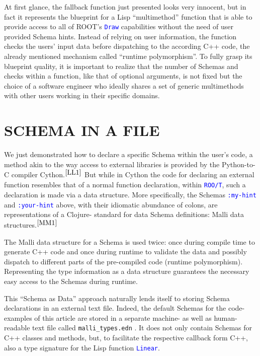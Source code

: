 \documentclass[twocolumn]{article}
\begin{document}
At first glance, the fallback function just presented looks very innocent, but in fact it represents the blueprint for a Lisp “multimethod” function that is able to provide access to all of ROOT’s \texttt{\textcolor{blue}{Draw}} capabilities without the need of user provided Schema hints. Instead of relying on user information, the function checks the users’ input data before dispatching to the according C++ code, the already mentioned mechanism called “runtime polymorphism”. To fully grasp its blueprint quality, it is important to realize that the number of Schemas and checks within a function, like that of optional arguments, is not fixed but the choice of a software engineer who ideally shares a set of generic multimethods with other users working in their specific domains.

\section{SCHEMA IN A FILE}
We just demonstrated how to declare a specific Schema within the user’s code, a method akin to the way access to external libraries is provided by the Python-to-C compiler Cython.$^{\cite{LL1}}$ But while in Cython the code for declaring an external function resembles that of a normal function declaration, within \texttt{\textcolor{blue}{ROO/T}}, such a declaration is made via a data structure. More specifically, the Schemas \texttt{\textcolor{blue}{:my-hint}} and \texttt{\textcolor{blue}{:your-hint}} above, with their idiomatic abundance of colons, are representations of a Clojure- standard for data Schema definitions: Malli data structures.$^{\cite{MM1}}$

The Malli data structure for a Schema is used twice: once during compile time to generate C++ code and once during runtime to validate the data and possibly dispatch to different parts of the pre-compiled code (runtime polymorphism). Representing the type information as a data structure guarantees the necessary easy access to the Schemas during runtime.

This “Schema as Data” approach naturally lends itself to storing Schema declarations in an external text file. Indeed, the default Schemas for the code-examples of this article are stored in a separate machine- as well as human-readable text file called \texttt{malli\_types.edn} . It does not only contain Schemas for C++ classes and methods, but, to facilitate the respective callback form C++, also a type signature for the Lisp function \texttt{\textcolor{blue}{Linear}}.
\end{document}
